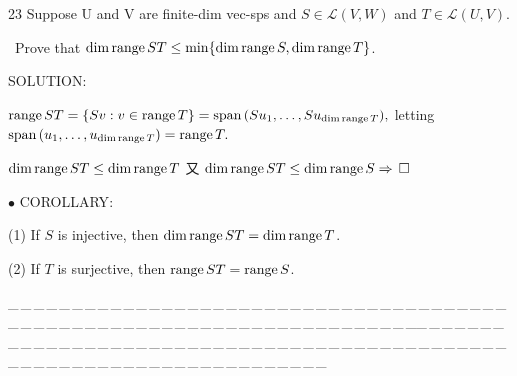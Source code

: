 \documentclass[a4paper, 11pt, UTF8]{article}
\def\range{\textup{range}\,}
\def\Spn{\textup{span}\,}
\def\Lm{\mathcal{L}}
\begin{document}
\begin{large}
{\timesbf\Large 23} {\timessl\Large 
Suppose U and V are finite-dim vec-sps and $S\in\Lm(V, W)$ and $T\in\Lm(U, V)$.}\par\quad\,
{\timessl\Large Prove that $\dim\range ST\leq\min\{\dim \range S, \dim\range T\}$.}\par
{\timesbf S\footnotesize{OLUTION:}}\par\quad
$\range ST=\{Sv:v\in\range T\}=\Spn(Su_1,\dots,Su_{\dim\range T}),$ letting $\Spn(u_1,\dots,u_{\dim\range T})=\range T.$\par\quad$\dim\range ST\leq \dim\range T$
又 $\dim\range ST\leq \dim\range S\Rightarrow\,\square$\par
{\small $\bullet$} {\timesbf\normalsize C{\footnotesize OROLLARY}:}\par\quad
(1) If $S$ is injective, then $\dim\range ST=\dim\range T$.\par\quad
(2) If $T$ is surjective, then $\range ST=\range S$.\par
{\tiny \_\,\_\,\_\,\_\,\_\,\_\,\_\,\_\,\_\,\_\,\_\,\_\,\_\,\_\,\_\,\_\,\_\,\_\,\_\,\_\,\_\,\_\,\_\,\_\,\_\,\_\,\_\,\_\,\_\,\_\,\_\,\_\,\_\,\_\,\_\,\_\,\_\,\_\,\_\,\_\,\_\,\_\,\_\,\_\,\_\,\_\,\_\,\_\,\_\,\_\,\_\,\_\,\_\,\_\,\_\,\_\,\_\,\_\,\_\,\_\,\_\,\_\,\_\,\_\,\_\,\_\,\_\,\_\,\_\,\_\,\_\_\,\_\,\_\,\_\,\_\,\_\,\_\,\_\,\_\,\_\,\_\,\_\,\_\,\_\,\_\,\_\,\_\,\_\,\_\,\_\,\_\,\_\,\_\,\_\,\_\,\_\,\_\,\_\,\_\,\_\,\_\,\_\,\_\,\_\,\_\,\_\,\_\,\_\,\_\,\_\,\_\,\_\,\_\,\_\,\_\,\_\,\_\,\_\,\_\,\_\,\_\,\_\,\_\,\_\,\_\,\_\,\_\,\_\,\_\,\_\,\_\,\_\,\_\,\_\,\_\,\_\,\_\,\_\,\_\,\_\,\_}\par


\end{large}
\end{document}
